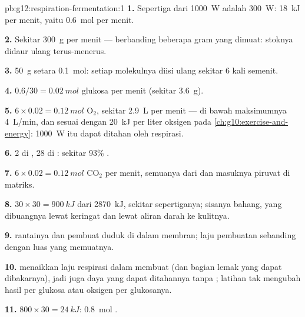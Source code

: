 \begin{solution}{pb:g12:respiration-fermentation:1}
\textbf{1.} Sepertiga dari \qty{1000}{W} adalah \qty{300}{W}: \qty{18}{kJ}
per menit, yaitu \qty{0.6}{mol}  per menit.

\textbf{2.} Sekitar \qty{300}{g} per menit --- berbanding beberapa gram
yang dimuat: stoknya didaur ulang terus-menerus.

\textbf{3.} \qty{50}{g} setara \qty{0.1}{mol}: setiap molekulnya diisi
ulang sekitar 6 kali semenit.

\textbf{4.} $0.6/30 = \qty{0.02}{mol}$ glukosa per menit (sekitar
\qty{3.6}{g}).

\textbf{5.} $6 \times 0.02 = \qty{0.12}{mol}$ $\mathrm{O_2}$, sekitar
\qty{2.9}{L} per menit --- di bawah maksimumnya \qty{4}{L/min}, dan
sesuai dengan \qty{20}{kJ} per liter oksigen pada
\cref{ch:g10:exercise-and-energy}: \qty{1000}{W} itu dapat ditahan
oleh respirasi.

\textbf{6.} 2 di , 28 di : sekitar 93\%
.

\textbf{7.} $6 \times 0.02 = \qty{0.12}{mol}$ $\mathrm{CO_2}$ per
menit, semuanya dari  dan masuknya piruvat di matriks.

\textbf{8.} $30 \times 30 = \qty{900}{kJ}$ dari \qty{2870}{kJ}, sekitar
sepertiganya; sisanya bahang, yang dibuangnya lewat keringat dan lewat
aliran darah ke kulitnya.

\textbf{9.}  rantainya dan  pembuat  duduk di dalam
membran; laju pembuatan  sebanding dengan luas yang memuatnya.

\textbf{10.}  menaikkan laju respirasi dalam membuat  (dan
bagian lemak yang dapat dibakarnya), jadi juga daya yang dapat
ditahannya tanpa ; latihan tak mengubah hasil per glukosa
atau oksigen per glukosanya.

\textbf{11.} $800 \times 30 = \qty{24}{kJ}$: \qty{0.8}{mol} .


\end{solution}
